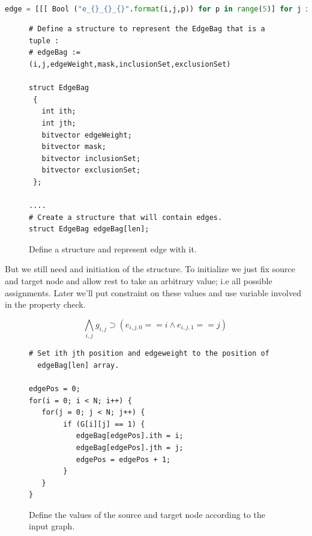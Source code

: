 \documentclass[preprint,12pt]{elsarticle}
\begin{document}
\begin{lstlisting}[language=Python,
mathescape,
 breaklines,
  rulecolor=\color{black},
  frame=single,
  caption= \textbf{Logical encoding of the edgeBag.}
]

edge = [[[ Bool ("e_{}_{}_{}".format(i,j,p)) for p in range(5)] for j in range(N)] for i in range(N)] 

\end{lstlisting}


\begin{figure}[ht]
\begin{verbatim}
# Define a structure to represent the EdgeBag that is a tuple :
# edgeBag := (i,j,edgeWeight,mask,inclusionSet,exclusionSet)

struct EdgeBag
 {
   int ith;
   int jth;
   bitvector edgeWeight;
   bitvector mask;
   bitvector inclusionSet;
   bitvector exclusionSet;
 };
 
....
# Create a structure that will contain edges. 
struct EdgeBag edgeBag[len];     

\end{verbatim}
\caption{Define a structure and represent edge with it.}
\label{code:motivate}
\end{figure}
 

But we still need and initiation of the structure. To initialize we just fix source and target node and allow rest to take an arbitrary value; i.e all possible assignments. Later we'll put constraint on these values and use variable involved in the property check.

\[ \bigwedge\limits_{i,j} g_{i,j} \supset (e_{i,j,0} == i \land e_{i,j,1} == j) \, \]

%

\begin{figure}[ht]
\begin{verbatim}
# Set ith jth position and edgeweight to the position of
  edgeBag[len] array. 

edgePos = 0;
for(i = 0; i < N; i++) {
   for(j = 0; j < N; j++) {
        if (G[i][j] == 1) {
           edgeBag[edgePos].ith = i;
           edgeBag[edgePos].jth = j;
           edgePos = edgePos + 1;
        }
   }
}  
\end{verbatim}
\caption{Define the values of the source and target node according to the input graph.}
\label{code:motivate}
\end{figure}
 
\end{document}
